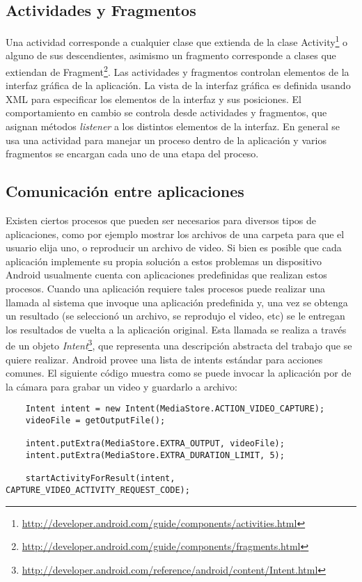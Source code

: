 \subsection*{Actividades y Fragmentos}

Una actividad corresponde a cualquier clase que extienda de la clase Activity\footnote{\url{http://developer.android.com/guide/components/activities.html}} o alguno de sus descendientes, asimismo un fragmento corresponde a clases que extiendan de Fragment\footnote{\url{http://developer.android.com/guide/components/fragments.html}}. Las actividades y fragmentos controlan elementos de la interfaz gráfica de la aplicación. La vista de la interfaz gráfica es definida usando XML para especificar los elementos de la interfaz y sus posiciones. El comportamiento en cambio se controla desde actividades y fragmentos, que asignan métodos \emph{listener} a los distintos elementos de la interfaz. 
En general se usa una actividad para manejar un proceso dentro de la aplicación y varios fragmentos se encargan cada uno de una etapa del proceso.

\subsection*{Comunicación entre aplicaciones}

Existen ciertos procesos que pueden ser necesarios para diversos tipos de aplicaciones, como por ejemplo mostrar los archivos de una carpeta para que el usuario elija uno, o reproducir un archivo de video. Si bien es posible que cada aplicación implemente su propia solución a estos problemas un dispositivo Android usualmente cuenta con aplicaciones predefinidas que realizan estos procesos. Cuando una aplicación requiere tales procesos puede realizar una llamada al sistema que invoque una aplicación predefinida y, una vez se obtenga un resultado (se seleccionó un archivo, se reprodujo el video, etc) se le entregan los resultados de vuelta a la aplicación original. Esta llamada se realiza a través de un objeto \emph{Intent}\footnote{\url{http://developer.android.com/reference/android/content/Intent.html}}, que representa una descripción abstracta del trabajo que se quiere realizar. Android provee una lista de intents estándar para acciones comunes. 
El siguiente código muestra como se puede invocar la aplicación por de la cámara para grabar un video y guardarlo a archivo:
\begin{lstlisting}
    Intent intent = new Intent(MediaStore.ACTION_VIDEO_CAPTURE);
    videoFile = getOutputFile();

    intent.putExtra(MediaStore.EXTRA_OUTPUT, videoFile);
    intent.putExtra(MediaStore.EXTRA_DURATION_LIMIT, 5);

    startActivityForResult(intent, CAPTURE_VIDEO_ACTIVITY_REQUEST_CODE);
\end{lstlisting}

